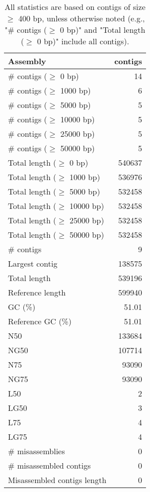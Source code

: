 \documentclass[12pt,a4paper]{article}
\begin{document}
\begin{table}[ht]
\begin{center}
\caption{All statistics are based on contigs of size $\geq$ 400 bp, unless otherwise noted (e.g., "\# contigs ($\geq$ 0 bp)" and "Total length ($\geq$ 0 bp)" include all contigs).}
\begin{tabular}{|l*{1}{|r}|}
\hline
Assembly & contigs \\ \hline
\# contigs ($\geq$ 0 bp) & 14 \\ \hline
\# contigs ($\geq$ 1000 bp) & 6 \\ \hline
\# contigs ($\geq$ 5000 bp) & 5 \\ \hline
\# contigs ($\geq$ 10000 bp) & 5 \\ \hline
\# contigs ($\geq$ 25000 bp) & 5 \\ \hline
\# contigs ($\geq$ 50000 bp) & 5 \\ \hline
Total length ($\geq$ 0 bp) & 540637 \\ \hline
Total length ($\geq$ 1000 bp) & 536976 \\ \hline
Total length ($\geq$ 5000 bp) & 532458 \\ \hline
Total length ($\geq$ 10000 bp) & 532458 \\ \hline
Total length ($\geq$ 25000 bp) & 532458 \\ \hline
Total length ($\geq$ 50000 bp) & 532458 \\ \hline
\# contigs & 9 \\ \hline
Largest contig & 138575 \\ \hline
Total length & 539196 \\ \hline
Reference length & 599940 \\ \hline
GC (\%) & 51.01 \\ \hline
Reference GC (\%) & 51.01 \\ \hline
N50 & 133684 \\ \hline
NG50 & 107714 \\ \hline
N75 & 93090 \\ \hline
NG75 & 93090 \\ \hline
L50 & 2 \\ \hline
LG50 & 3 \\ \hline
L75 & 4 \\ \hline
LG75 & 4 \\ \hline
\# misassemblies & 0 \\ \hline
\# misassembled contigs & 0 \\ \hline
Misassembled contigs length & 0 \\ \hline

\end{tabular}
\end{center}
\end{table}
\end{document}
